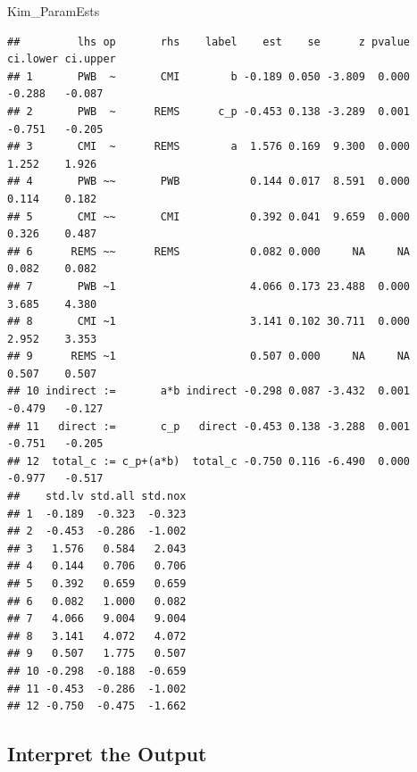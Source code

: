 \documentclass[
  11pt,
]{book}
\newenvironment{Shaded}{\begin{snugshade}}{\end{snugshade}}
\newcommand{\NormalTok}[1]{#1}
\begin{document}
\begin{Shaded}
\begin{Highlighting}[]
\NormalTok{Kim\_ParamEsts}
\end{Highlighting}
\end{Shaded}

\begin{verbatim}
##         lhs op       rhs    label    est    se      z pvalue ci.lower ci.upper
## 1       PWB  ~       CMI        b -0.189 0.050 -3.809  0.000   -0.288   -0.087
## 2       PWB  ~      REMS      c_p -0.453 0.138 -3.289  0.001   -0.751   -0.205
## 3       CMI  ~      REMS        a  1.576 0.169  9.300  0.000    1.252    1.926
## 4       PWB ~~       PWB           0.144 0.017  8.591  0.000    0.114    0.182
## 5       CMI ~~       CMI           0.392 0.041  9.659  0.000    0.326    0.487
## 6      REMS ~~      REMS           0.082 0.000     NA     NA    0.082    0.082
## 7       PWB ~1                     4.066 0.173 23.488  0.000    3.685    4.380
## 8       CMI ~1                     3.141 0.102 30.711  0.000    2.952    3.353
## 9      REMS ~1                     0.507 0.000     NA     NA    0.507    0.507
## 10 indirect :=       a*b indirect -0.298 0.087 -3.432  0.001   -0.479   -0.127
## 11   direct :=       c_p   direct -0.453 0.138 -3.288  0.001   -0.751   -0.205
## 12  total_c := c_p+(a*b)  total_c -0.750 0.116 -6.490  0.000   -0.977   -0.517
##    std.lv std.all std.nox
## 1  -0.189  -0.323  -0.323
## 2  -0.453  -0.286  -1.002
## 3   1.576   0.584   2.043
## 4   0.144   0.706   0.706
## 5   0.392   0.659   0.659
## 6   0.082   1.000   0.082
## 7   4.066   9.004   9.004
## 8   3.141   4.072   4.072
## 9   0.507   1.775   0.507
## 10 -0.298  -0.188  -0.659
## 11 -0.453  -0.286  -1.002
## 12 -0.750  -0.475  -1.662
\end{verbatim}

\hypertarget{interpret-the-output-1}{%
\subsection{Interpret the Output}\label{interpret-the-output-1}}
\end{document}
